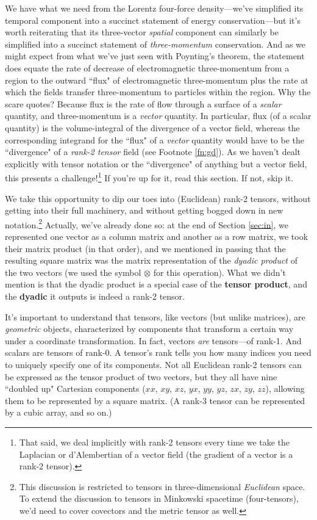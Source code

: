 \documentclass[12pt]{article}
\begin{document}
We have what we need from the Lorentz four-force density---we've simplified its temporal component into a succinct statement of energy conservation---but it's worth reiterating that its three-vector \emph{spatial} component can similarly be simplified into a succinct statement of \emph{three-momentum} conservation. And as we might expect from what we've just seen with Poynting's theorem, the statement does equate the rate of decrease of electromagnetic three-momentum from a region to the outward ``flux" of electromagnetic three-momentum plus the rate at which the fields transfer three-momentum to particles within the region. Why the scare quotes? Because flux is the rate of flow through a surface of a \emph{scalar} quantity, and three-momentum is a \emph{vector} quantity. In particular, flux (of a scalar quantity) is the volume-integral of the divergence of a vector field, whereas the corresponding integrand for the ``flux" of a \emph{vector} quantity would have to be the ``divergence" of a \emph{rank-2 tensor} field (see Footnote \ref{fn:gd}). As we haven't dealt explicitly with tensor notation or the ``divergence" of anything but a vector field, this presents a challenge!\footnote{That said, we deal implicitly with rank-2 tensors every time we take the Laplacian or d'Alembertian of a vector field (the gradient of a vector is a rank-2 tensor).} If you're up for it, read this section. If not, skip it.

We take this opportunity to dip our toes into (Euclidean) rank-2 tensors, without getting into their full machinery, and without getting bogged down in new notation.\footnote{This discussion is restricted to tensors in three-dimensional \emph{Euclidean} space. To extend the discussion to tensors in Minkowski spacetime (four-tensors), we'd need to cover covectors and the metric tensor as well.} Actually, we've already done so: at the end of Section \ref{sec:in}, we represented one vector as a column matrix and another as a row matrix, we took their matrix product (in that order), and we mentioned in passing that the resulting square matrix was the matrix representation of the \emph{dyadic product} of the two vectors (we used the symbol $\otimes$ for this operation). What we didn't mention is that the dyadic product is a special case of the \textbf{tensor product}, and the \textbf{dyadic} it outputs is indeed a rank-2 tensor.

It's important to understand that tensors, like vectors (but unlike matrices), are \emph{geometric} objects, characterized by components that transform a certain way under a coordinate transformation. In fact, vectors \emph{are} tensors---of rank-1. And scalars are tensors of rank-0. A tensor's rank tells you how many indices you need to uniquely specify one of its components. Not all Euclidean rank-2 tensors can be expressed as the tensor product of two vectors, but they all have nine ``doubled up" Cartesian components ($xx$, $xy$, $xz$, $yx$, $yy$, $yz$, $zx$, $zy$, $zz$), allowing them to be represented by a square matrix. (A rank-3 tensor can be represented by a cubic array, and so on.)
\end{document}
